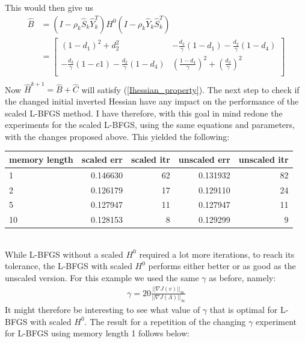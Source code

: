 \documentclass[11pt,a4paper]{article}
\begin{document}
This would then give us 
\begin{align*}
\hat{B} &= (I-\rho_k\hat{S}_k\hat{Y}_k^T)H^0(I-\rho_k\hat{Y}_k\hat{S}_k^T)  \\
&=\left[ \begin{array}{cc}
   	(1-d_1)^2 + d_2^2& -\frac{d_3}{\gamma}(1-d_1) -\frac{d_2}{\gamma}(1-d_4)\\
    	-\frac{d_3}{\gamma}(1-c1)-\frac{d_2}{\gamma}(1-d_4)& (\frac{1-d_4}{\gamma})^2 +(\frac{d_3}{\gamma})^2\\
   \end{array}  \right] \\
\end{align*}
Now $\hat{H}^{k+1}=\hat{B}+\hat{C}$ will satisfy (\ref{Ihessian_property}). The next step to check if the changed initial inverted Hessian have any impact on the performance of the scaled L-BFGS method. I have therefore, with this goal in mind redone the experiments for the scaled L-BFGS, using the same equations and parameters, with the changes proposed above. This yielded the following:
\\
\begin{tabular}{lrrrr}
\toprule
{} memory length &  scaled err &  scaled itr &  unscaled err &  unscaled itr \\
\midrule
1  &    0.146630 &          62 &      0.131932 &            82 \\
2  &    0.126179 &          17 &      0.129110 &            24 \\
5  &    0.127947 &          11 &      0.127947 &            11 \\
10 &    0.128153 &           8 &      0.129299 &             9 \\
\bottomrule
\end{tabular}
\\
While L-BFGS without a scaled $H^0$ required a lot more iterations, to reach its tolerance, the L-BFGS with scaled $H^0$ performs either better or as good as the unscaled version. For this example we used the same $\gamma$ as before, namely:
\begin{align*}
\gamma = 20\frac{||\nabla J(v)||_{\infty}}{||\nabla J(\Lambda)||_{\infty}}
\end{align*}
It might therefore be interesting to see what value of $\gamma$ that is optimal for L-BFGS with scaled $H^0$. The result for a repetition of the changing $\gamma$ experiment for L-BFGS using memory length 1 follows below:
\\
\end{document}
